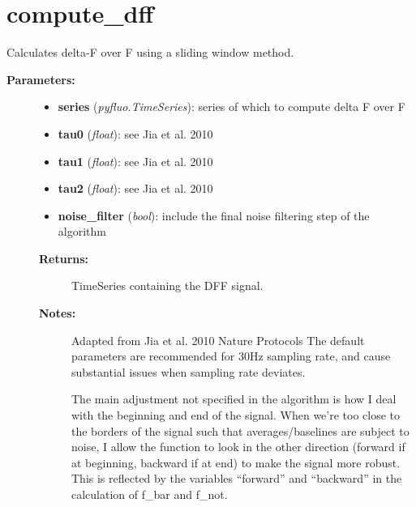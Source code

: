 \documentclass[letterpaper,10pt,english]{sphinxmanual}
\begin{document}
\section{compute\_dff}
\label{functions:compute-dff}

\begin{fulllineitems}
\label{functions:fluorescence.compute_dff}
Calculates delta-F over F using a sliding window method.
\begin{description}
\item[{\textbf{Parameters:} }] \leavevmode\begin{itemize}
\item {} 
\textbf{series} (\emph{pyfluo.TimeSeries}): series of which to compute delta F over F

\item {} 
\textbf{tau0} (\emph{float}): see Jia et al. 2010

\item {} 
\textbf{tau1} (\emph{float}): see Jia et al. 2010

\item {} 
\textbf{tau2} (\emph{float}): see Jia et al. 2010

\item {} 
\textbf{noise\_filter} (\emph{bool}): include the final noise filtering step of the algorithm

\end{itemize}
\begin{description}
\item[{\textbf{Returns:}}] \leavevmode
TimeSeries containing the DFF signal.

\item[{\textbf{Notes:}}] \leavevmode
Adapted from Jia et al. 2010 Nature Protocols
The default parameters are recommended for 30Hz sampling rate, and cause substantial issues when sampling rate deviates.

The main adjustment not specified in the algorithm is how I deal with the beginning and end of the signal. When we're too close to the borders of the signal such that averages/baselines are subject to noise, I allow the function to look in the other direction (forward if at beginning, backward if at end) to make the signal more robust. This is reflected by the variables ``forward'' and ``backward'' in the calculation of f\_bar and f\_not.

\end{description}

\end{description}

\end{fulllineitems}
\end{document}
